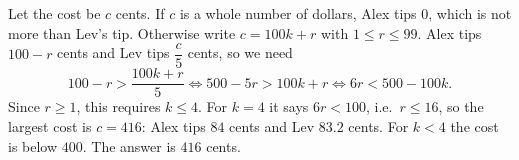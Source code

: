 Let the cost be $c$ cents. If $c$ is a whole number of dollars, Alex tips $0$, which is not more than Lev's tip. Otherwise write $c=100k+r$ with $1\le r\le99$. Alex tips $100-r$ cents and Lev tips $\dfrac{c}{5}$ cents, so we need
\[
100-r>\dfrac{100k+r}{5}\iff 500-5r>100k+r\iff 6r<500-100k .
\]
Since $r\ge1$, this requires $k\le4$. For $k=4$ it says $6r<100$, i.e.\ $r\le16$, so the largest cost is $c=416$: Alex tips $84$ cents and Lev $83.2$ cents. For $k<4$ the cost is below $400$. The answer is $\boxed{416}$ cents.
